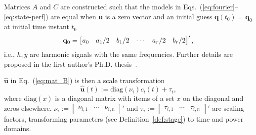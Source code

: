 \documentclass[letterpaper,10pt,journal,twoside]{IEEEtran}
\theoremstyle{definition}
\newtheorem{lem}[thm]{Lemma}
\begin{document}
{\color{blue}Matrices $A$ and $C$ are constructed such that t}he %
models in Eqs.~(\ref{eq:fourier}--\ref{eq:state-perf}) are equal
when $\mathbf{u}$ is a zero vector %
and an initial guess $\mathbf{q}(t_0)=\mathbf{q}_0$ at initial time instant $t_0$
  {\color{blue}\begin{equation}
  {\color{black}\mathbf{q}_0=\begin{bmatrix}a_0 & a_1/2 & b_1/2 & \cdots & a_r/2 & b_r/2\end{bmatrix}',}
  \end{equation}}
i.e., $h,y$ are %
harmonic signals with the same frequencies{\color{blue}. Further details are proposed in the first author's Ph.D. thesis~\cite{seewaldphdthesis}}.

$\hat{\mathbf{u}}$ in Eq.~(\ref{eq:mat_B}) is then a scale transformation
\begin{equation}
  \hat{\mathbf{u}}(t):=\mathrm{diag}(\nu_i)c_i(t)+\tau_i,
\end{equation}
where $\mathrm{diag}(x)$ is a diagonal matrix with items of a set $x$ on the diagonal and zeros elsewhere. $\nu_i:=\begin{bmatrix}\nu_{i,1}&\cdots&\nu_{i,n}\end{bmatrix}'$ and $\tau_i:=\begin{bmatrix}\tau_{i,1}&\cdots&\tau_{i,n}\end{bmatrix}'$ are scaling factors{\color{blue},} %
transform{\color{blue}ing} parameters %
(see Definition~\ref{def:stage}) to time and power domains.
\end{document}
